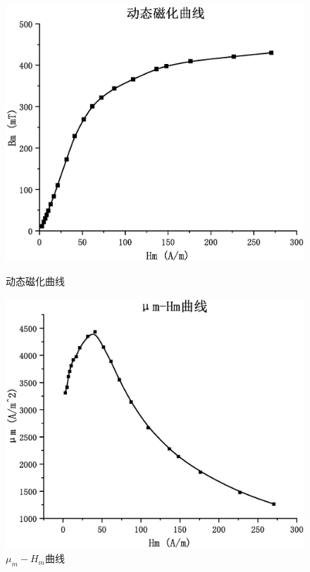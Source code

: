 \documentclass{article}
\begin{document}
    \clearpage
    \begin{figure}[htb]
        \centering
        \begin{minipage}{0.45\textwidth}
            \includegraphics[width=\textwidth]{动态磁化曲线.eps}
            \caption{动态磁化曲线}       
        \end{minipage}
        \begin{minipage}{0.45\textwidth}
            \includegraphics[width=\textwidth]{μm-Hm曲线.eps}
            \caption{$\mu_m-H_m$曲线}
        \end{minipage}
    \end{figure}
\end{document}
